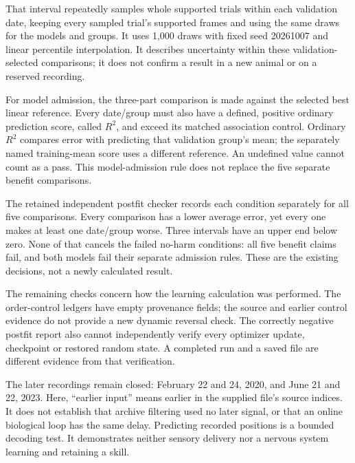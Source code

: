 That interval repeatedly samples whole supported trials within each validation
date, keeping every sampled trial's supported frames and using the same draws
for the models and groups. It uses 1,000 draws with fixed seed 20261007 and
linear percentile interpolation. It describes uncertainty within these
validation-selected comparisons; it does not confirm a result in a new animal
or on a reserved recording.

For model admission, the three-part comparison is made against the selected
best linear reference. Every date/group must also have a defined, positive
ordinary prediction score, called $R^2$, and exceed its matched association
control. Ordinary $R^2$ compares error with predicting
that validation group's mean; the separately named training-mean score uses
a different reference. An undefined value cannot count as a pass. This
model-admission rule does not replace the five separate benefit comparisons.

The retained independent postfit checker records each condition separately
for all five comparisons. Every comparison has a lower average error, yet
every one makes at least one date/group worse. Three intervals have an upper
end below zero. None of that cancels the failed no-harm conditions: all five
benefit claims fail, and both models fail their separate admission rules.
These are the existing decisions, not a newly calculated result.

The remaining checks concern how the learning calculation was performed. The
order-control ledgers have empty provenance fields; the source and earlier
control evidence do not provide a new dynamic reversal check. The correctly
negative postfit report also cannot independently verify every optimizer
update, checkpoint or restored random state. A completed run and a saved file
are different evidence from that verification.

The later recordings remain closed: February 22 and 24, 2020, and June 21 and
22, 2023. Here, ``earlier input'' means earlier in the supplied file's source
indices. It does not establish that archive filtering used no later signal,
or that an online biological loop has the same delay. Predicting recorded
positions is a bounded decoding test. It demonstrates neither sensory
delivery nor a nervous system learning and retaining a skill.
